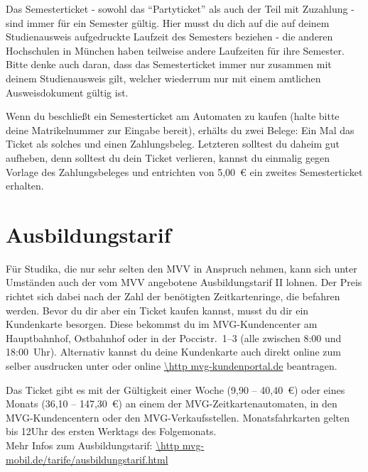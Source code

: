 Das Semesterticket - sowohl das "`Partyticket"' als auch der Teil mit Zuzahlung - sind immer für ein Semester gültig. Hier musst du dich auf die auf deinem Studienausweis aufgedruckte Laufzeit des Semesters beziehen - die anderen Hochschulen in München haben teilweise andere Laufzeiten für ihre Semester. Bitte denke auch daran, dass das Semesterticket immer nur zusammen mit deinem Studienausweis gilt, welcher wiederrum nur mit einem amtlichen Ausweisdokument gültig ist.

Wenn du beschließt ein Semesterticket am Automaten zu kaufen (halte bitte deine Matrikelnummer zur Eingabe bereit), erhälts du zwei Belege: Ein Mal das Ticket als solches und einen Zahlungsbeleg. Letzteren solltest du daheim gut aufheben, denn solltest du dein Ticket verlieren, kannst du einmalig gegen Vorlage des Zahlungsbeleges und entrichten von 5,00~€ ein zweites Semesterticket erhalten.

\section{Ausbildungstarif}
Für Studika, die nur sehr selten den MVV in Anspruch nehmen, kann sich unter Umständen auch der vom MVV angebotene Ausbildungstarif II lohnen. Der Preis richtet sich dabei nach der Zahl der benötigten Zeitkartenringe, die befahren werden. Bevor du dir aber ein Ticket kaufen kannst, musst du dir ein Kundenkarte besorgen. Diese bekommst du im MVG-Kundencenter am Hauptbahnhof, Ostbahnhof oder in der Poccistr.~1--3 (alle zwischen 8:00 und 18:00~Uhr). Alternativ kannst du deine Kundenkarte auch direkt online zum selber ausdrucken unter oder online \url{\http mvg-kundenportal.de} beantragen.

Das Ticket gibt es mit der Gültigkeit einer Woche (9,90 -- 40,40~€) oder eines Monats (36,10 -- 147,30~€) an einem der MVG-Zeitkartenautomaten, in den MVG-Kundencentern oder den MVG-Verkaufsstellen. Monatsfahrkarten gelten bis 12Uhr des ersten Werktags des Folgemonats.\\

Mehr Infos zum Ausbildungstarif: \url{\http mvg-mobil.de/tarife/ausbildungstarif.html}